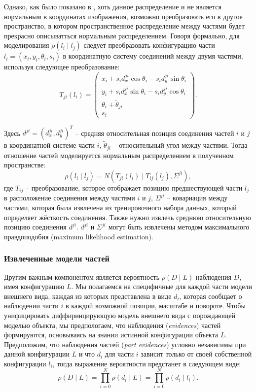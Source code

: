 Однако, как было показано в \cite{felzenszwalb05}, хоть данное распределение и не является нормальным в координатах изображения, возможно преобразовать его в другое пространство, в котором пространственное распределение между частями будет прекрасно описыватться нормальным распределением. Говоря формально, для моделирования \(\rho(l_i{\mid}l_j)\) следует преобразовать конфигурацию части \(l_i = (x_i, y_i, \theta_i, s_i)\) в координатную систему соединений между двумя частями, используя следующее преобразование:
\begin{equation}
  T_{ji}(l_i) =
  \begin{pmatrix}
    x_i + s_id_x^{ji}\cos{\theta_i} - s_id_y^{ji}\sin{\theta_i}\\
    y_i + s_id_x^{ji}\sin{\theta_i} - s_id_y^{ji}\cos{\theta_i}\\
    \theta_i + \tilde{\theta}_{ji}\\
    s_i
  \end{pmatrix}.
\end{equation}

Здесь \(d^{ji} = (d_x^{ji}, d_y^{ji})^T\) -- средняя относительная позиция соединения частей \(i\) и \(j\) в координатной системе части \(i\), \(\tilde{\theta}_{ji}\) -- относительный угол между частями. Тогда отношение частей моделируется нормальным распределением в полученном пространстве:
\begin{equation}
  \rho(l_i{\mid}l_j) = N(T_{ji}(l_i){\mid}T_{ij}(l_j), \Sigma^{ji}),
\end{equation}
где \(T_{ij}\) -- преобразование, которое отображает позицию предшествующей части \(l_j\) в расположение соединения между частями \(i\) и \(j\), \(\Sigma^{ji}\) -- ковариация между частями, которая была извлечена из тренировочного набора данных, который определяет жёсткость соединения. Также нужно извлечь среднюю относительную позицию соединения \(d^{ji}\). \(d^{ji}\) и \(\Sigma^{ji}\) могут быть извлечены методом максимального правдоподобия (maximum likelihood estimation).

\subsubsection{Извлеченные модели частей}

Другим важным компонентом является вероятность \(\rho(D{\mid}L)\) наблюдения \(D\), имея конфигурацию \(L\). Мы полагаемся на специфичные для каждой части модели внешнего вида, каждая из которых представлена в виде \(d_i\), которая сообщает о наблюдении части \(i\) в каждой возможной позиции, масштабе и повороте. Чтобы унифицировать диффиринцирующую модель внешнего вида с порождающей моделью объекта, мы предпологаем, что наблюдения (\emph{evidences}) частей формируются, основываясь на знании истинной конфигурации объекта \(L\). Предположим, что наблюдения частей (\emph{part evidences}) условно независимы при данной конфигурации \(L\) и что \(d_i\) для части \(i\) зависит только от своей собственной конфигурации \(l_i\), тогда выражение вероятности предстанет в следующем виде:
\begin{equation}
  \rho(D{\mid}L) = \prod_{i = 0}^N\rho(d_i{\mid}L) = \prod_{i = 0}^N\rho(d_i{\mid}l_i).
\end{equation}

